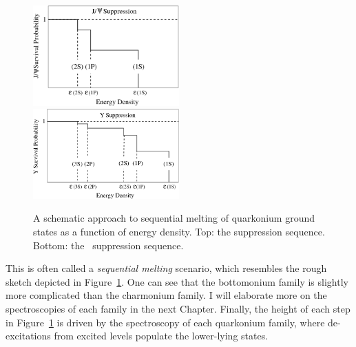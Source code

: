 \begin{figure}[h]
\begin{center}
  \includegraphics[width=0.5\textwidth]{Chapters/pQCD/seq-charm.png}
  \\ \vspace{1cm}
  \includegraphics[width=0.5\textwidth]{Chapters/pQCD/seq-bottom.png}
 \caption{A schematic approach to sequential melting of quarkonium
   ground states as a function of energy density. Top: the \Jpsi
   suppression sequence. Bottom: the \PgUa~suppression sequence.}
 \label{fig:sequential}
\end{center}
\end{figure}
\newpage
This is often called a
\textit{sequential melting} scenario, which resembles the rough sketch depicted
in Figure~\ref{fig:sequential}. One can see that the bottomonium
family is slightly more complicated than the charmonium family. I
will elaborate more on the spectroscopies of each family in the next
Chapter. Finally, the height of each step in
Figure~\ref{fig:sequential} is driven by the spectroscopy of each
quarkonium family, where de-excitations from excited levels populate the
lower-lying states.%


\vspace{0.5em}
\begin{center}
\end{center}



